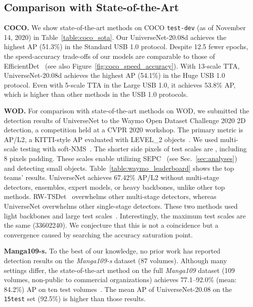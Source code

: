 \documentclass[10pt,twocolumn,letterpaper]{article}
\newcommand{\OurOrig}{UniverseNet\xspace}
\newcommand{\OurAugustD}{UniverseNet-20.08d\xspace}
\newcommand{\OurAugust}{UniverseNet-20.08\xspace}
\newcommand{\Mangas}{Manga109-s\xspace}
\begin{document}
\subsection{Comparison with State-of-the-Art}
\label{sec:sota_comparison}


\textbf{COCO.}
We show state-of-the-art methods on COCO \texttt{test-dev}
(as of November 14, 2020)
in Table~\ref{table:coco_sota}.
Our \OurAugustD achieves the highest AP (51.3\%) in the Standard USB 1.0 protocol.
Despite 12.5 fewer epochs, the speed-accuracy trade-offs of our models are comparable to those of EfficientDet~\cite{EfficientDet_CVPR2020} (see also Figure~\ref{fig:coco_speed_accuracy}).
With 13-scale TTA, \OurAugustD achieves the highest AP (54.1\%) in the Huge USB 1.0 protocol.
Even with 5-scale TTA in the Large USB 1.0,
it achieves 53.8\% AP,
which is higher than other methods in the USB 1.0 protocols.


\textbf{WOD.}
For comparison with state-of-the-art methods on WOD,
we submitted the detection results of \OurOrig to the Waymo Open Dataset Challenge 2020 2D detection,
a competition held at a CVPR 2020 workshop.
The primary metric is AP/L2,
a KITTI-style AP evaluated with LEVEL\_2 objects~\cite{WaymoOpenDataset_CVPR2020, WaymoOpenDataset_2D_detection_leaderboard}.
We used multi-scale testing with soft-NMS~\cite{SoftNMS_ICCV2017}.
The shorter side pixels of test scales are , including 8 pixels padding.
These scales enable utilizing SEPC~\cite{SEPC_CVPR2020} (see Sec.~\ref{sec:analyses}) and detecting small objects.
Table~\ref{table:waymo_leaderboard} shows the top teams' results.
\OurOrig achieves 67.42\% AP/L2
without multi-stage detectors, ensembles, expert models, or heavy backbones, unlike other top methods.
RW-TSDet~\cite{Waymo2d_1st_2020} overwhelms other multi-stage detectors,
whereas UniverseNet overwhelms other single-stage detectors.
These two methods used light backbones and large test scales~\cite{ashraf2016shallow}.
Interestingly, the maximum test scales are the same (33602240).
We conjecture that this is not a coincidence but a convergence caused by searching the accuracy saturation point.




\textbf{\Mangas.}
To the best of our knowledge, no prior work has reported detection results on the \textit{\Mangas} dataset (87 volumes).
Although many settings differ,
the state-of-the-art method on the full \textit{Manga109} dataset (109 volumes, non-public to commercial organizations)
achieves 77.1--92.0\% (mean: 84.2\%) AP on ten test volumes~\cite{Manga109_detection_Ogawa_2018}.
The mean AP of \OurAugust on the \texttt{15test} set (92.5\%) is higher than those results.
\end{document}

